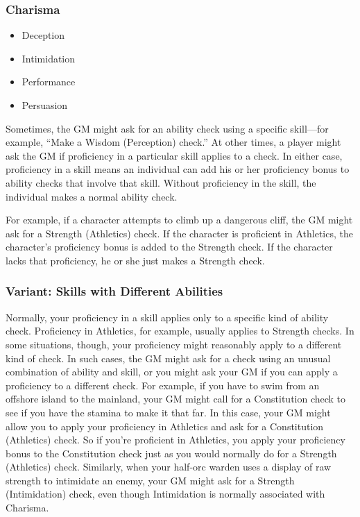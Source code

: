 \subsubsection{Charisma}

\begin{itemize}
\item Deception
\item Intimidation
\item Performance
\item Persuasion
\end{itemize}

Sometimes, the GM might ask for an ability check using a specific skill—for example, “Make a Wisdom (Perception) check.” At other times, a player might ask the GM if proficiency in a particular skill applies to a check. In either case, proficiency in a skill means an individual can add his or her proficiency bonus to ability checks that involve that skill. Without proficiency in the skill, the individual makes a normal ability check.

For example, if a character attempts to climb up a dangerous cliff, the GM might ask for a Strength (Athletics) check. If the character is proficient in Athletics, the character's proficiency bonus is added to the Strength check. If the character lacks that proficiency, he or she just makes a Strength check.

\subsubsection{Variant: Skills with Different Abilities}

Normally, your proficiency in a skill applies only to a specific kind of ability check. Proficiency in Athletics, for example, usually applies to Strength checks. In some situations, though, your proficiency might reasonably apply to a different kind of check. In such cases, the GM might ask for a check using an unusual combination of ability and skill, or you might ask your GM if you can apply a proficiency to a different check. For example, if you have to swim from an offshore island to the mainland, your GM might call for a Constitution check to see if you have the stamina to make it that far. In this case, your GM might allow you to apply your proficiency in Athletics and ask for a Constitution (Athletics) check. So if you're proficient in Athletics, you apply your proficiency bonus to the Constitution check just as you would normally do for a Strength (Athletics) check. Similarly, when your half-orc warden uses a display of raw strength to intimidate an enemy, your GM might ask for a Strength (Intimidation) check, even though Intimidation is normally associated with Charisma.

